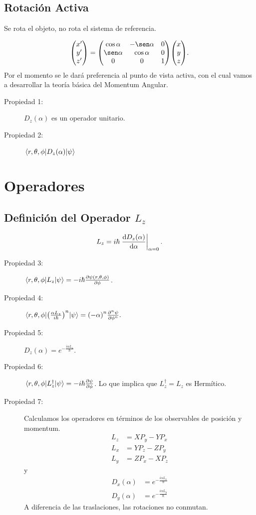 \subsection{Rotación Activa}
Se rota el objeto, no rota el sistema de referencia.

$$ \mqty(x' \\ y' \\ z') = \mqty(\cos \alpha & -\sen \alpha & 0 \\ \sen \alpha & \cos \alpha & 0 \\ 0 & 0 & 1) \mqty(x \\ y \\ z). $$
Por el momento se le dará preferencia al punto de vista activa, con el cual vamos a desarrollar la teoría básica del Momentum Angular.

\begin{description}
	\item[Propiedad 1: ] $D_z (\alpha)$ es un operador unitario.
	\item[Propiedad 2: ] $\mel{r,\theta ,\phi}{D_z (\alpha)}{\psi}$
\end{description}


\section{Operadores}

\subsection{Definición del Operador $L_z$}
\begin{equation}
	L_z = i\hbar \eval{ \dv{D_z (\alpha)}{\alpha} }_{\alpha = 0}.
\end{equation}


\begin{description}
	\item[Propiedad 3: ] $\mel{r,\theta, \phi}{L_z}{\psi} = -i\hbar \pdv{\psi (r,\theta,\phi)}{\phi}$.
	\item[Propiedad 4: ] $\mel{r,\theta ,\phi}{\qty(\frac{\alpha L_z}{i\hbar})^n}{\psi} = \qty(-\alpha)^n \pdv[n]{\psi}{\phi}.$
	\item[Propiedad 5: ] $D_z (\alpha) = e^{-\frac{i\alpha L_z}{\hbar}}$.
	\item[Propiedad 6: ] $\mel{r,\theta ,\phi}{L_z ^\dagger}{\psi} = -i\hbar \pdv{\psi}{\phi}$. Lo que implica que $L_z ^\dagger = L_z$ es Hermítico.
	\item[Propiedad 7: ] Calculamos los operadores en términos de los observables de posición y momentum.
			\begin{align}
				L_z &= XP_y - YP_x \\
				L_x &= YP_z - ZP_y \\
				L_y &= ZP_x - XP_z 
			\end{align}
		y
			\begin{align*}
				D_x (\alpha) &= e^{-\frac{i\alpha L_x}{\hbar}} \\
				D_y (\alpha) &= e^{-\frac{i\alpha L_y}{\hbar}}
			\end{align*}
		A diferencia de las traslaciones, las rotaciones no conmutan.
\end{description}


